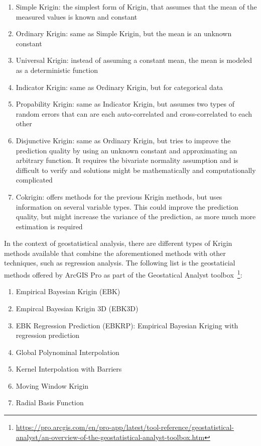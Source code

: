 \begin{enumerate}
    \item Simple Krigin: the simplest form of Krigin, that assumes that the mean of the measured values is known and constant
    \item Ordinary Krigin: same as Simple Krigin, but the mean is an unknown constant
    \item Universal Krigin: instead of assuming a constant mean, the mean is modeled as a deterministic function
    \item Indicator Krigin: same as Ordinary Krigin, but for categorical data
    \item Propability Krigin: same as Indicator Krigin, but assumes two types of random errors that can are each auto-correlated and cross-correlated to each other
    \item Disjunctive Krigin: same as Ordinary Krigin, but tries to improve the prediction quality by using an unknown constant and approximating an arbitrary function. It requires the bivariate normality assumption and is difficult to verify and solutions might be mathematically and computationally complicated
    \item Cokrigin: offers methods for the previous Krigin methods, but uses information on several variable types. This could improve the prediction quality, but might increase the variance of the prediction, as more much more estimation is required
\end{enumerate}

In the context of geostatistical analysis, there are different types of Krigin methods available that combine the aforementioned methods with other techniques, such as regression analysis. The following list is the geostaticial methods offered by ArcGIS Pro as part of the Geostatical Analyst toolbox~\footnote{\url{https://pro.arcgis.com/en/pro-app/latest/tool-reference/geostatistical-analyst/an-overview-of-the-geostatistical-analyst-toolbox.htm}}:

\begin{enumerate}
    \item Empirical Bayesian Krigin (EBK)
    \item Empircal Bayesian Krigin 3D (EBK3D)
    \item EBK Regression Prediction (EBKRP): Empirical Bayesian Kriging with regression prediction
    \item Global Polynominal Interpolation
    \item Kernel Interpolation with Barriers
    \item Moving Window Krigin
    \item Radial Basis Function
\end{enumerate}

